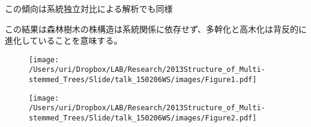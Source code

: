 \documentclass[a0, 36pt, plainboxedsections]{sciposter} %
\begin{document}
\begin{multicols}{2}
この傾向は系統独立対比による解析でも同様

この結果は森林樹木の株構造は系統関係に依存せず、多幹化と高木化は背反的に進化していることを意味する。

\begin{figure}
	\begin{center}
		\texttt{[image: /Users/uri/Dropbox/LAB/Research/2013Structure\_of\_Multi-stemmed\_Trees/Slide/talk\_150206WS/images/Figure1.pdf]}
		
		\texttt{[image: /Users/uri/Dropbox/LAB/Research/2013Structure\_of\_Multi-stemmed\_Trees/Slide/talk\_150206WS/images/Figure2.pdf]}
	\end{center}
\end{figure}

\end{multicols}
\begin{mdframed}[style=section.frame]
  \centering\huge\textbf{}
\end{mdframed}
\end{document}
